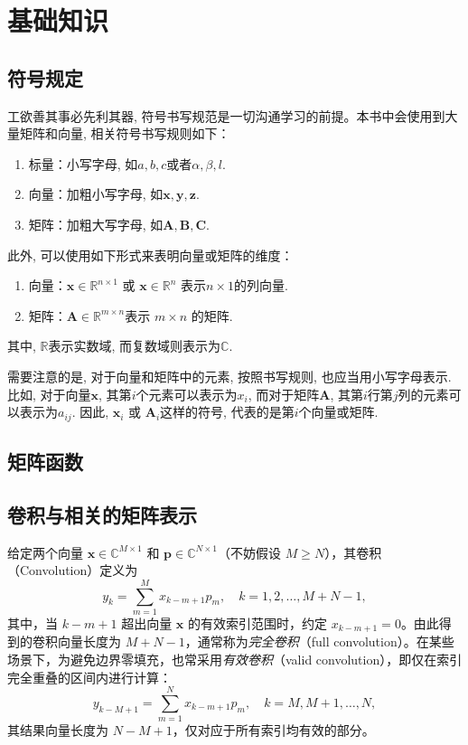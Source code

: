 \appendix
\chapter{基础知识}


\section{符号规定}

工欲善其事必先利其器, 符号书写规范是一切沟通学习的前提。本书中会使用到大量矩阵和向量, 相关符号书写规则如下：
\begin{enumerate}
    \item 标量：小写字母, 如$a,b,c$或者$\alpha, \beta, l$.
    \item 向量：加粗小写字母, 如$\bm{x},\bm{y},\bm{z}$.
    \item 矩阵：加粗大写字母, 如$\mathbf{A},\mathbf{B},\mathbf{C}$.
\end{enumerate}


此外, 可以使用如下形式来表明向量或矩阵的维度：
\begin{enumerate}
    \item 向量：$\bm{x} \in \mathbb{R}^{n \times 1}$ 或 $\bm{x} \in \mathbb{R}^{n}$ 表示\( n \times 1 \)的列向量.
    \item 矩阵：$\mathbf{A} \in \mathbb{R}^{m \times n}$表示 $m \times n$ 的矩阵.
\end{enumerate}
其中, $\mathbb{R}$表示实数域, 而复数域则表示为$\mathbb{C}$.

需要注意的是, 对于向量和矩阵中的元素, 按照书写规则, 也应当用小写字母表示. 比如, 对于向量$\bm{x}$, 其第$i$个元素可以表示为$x_i$, 而对于矩阵$\mathbf{A}$, 其第$i$行第$j$列的元素可以表示为$a_{ij}$. 因此, \( \bm{x}_i \) 或 \( \mathbf{A}_i \)这样的符号, 代表的是第\( i \)个向量或矩阵.

\section{矩阵函数}

\section{卷积与相关的矩阵表示}\label{apx.conv-corr-mat}

给定两个向量 \( \bm{x} \in \mathbb{C}^{M \times 1} \) 和 \( \bm{p} \in \mathbb{C}^{N \times 1} \)（不妨假设 \( M \geq N \)），其卷积（Convolution）定义为
\begin{equation}
    y_k = \sum_{m=1}^{M} x_{k-m+1} p_m,
    \quad k = 1,2,\ldots, M+N-1,
\end{equation}
其中，当 \(k-m+1\) 超出向量 \(\bm{x}\) 的有效索引范围时，约定 \(x_{k-m+1}=0\)。由此得到的卷积向量长度为 \(M+N-1\)，通常称为\emph{完全卷积}（full convolution）。在某些场景下，为避免边界零填充，也常采用\emph{有效卷积}（valid convolution），即仅在索引完全重叠的区间内进行计算：
\begin{equation}
    y_{k-M+1} = \sum_{m=1}^{N} x_{k-m+1} p_m,
    \quad k = M, M+1, \ldots, N,
\end{equation}
其结果向量长度为 \(N-M+1\)，仅对应于所有索引均有效的部分。

